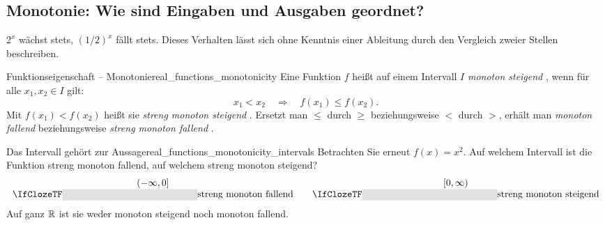 \subsection{Monotonie: Wie sind Eingaben und Ausgaben geordnet?}
\label{subsec:real_functions_monotonicity}
$2^x$ wächst stets, $(1/2)^x$ fällt stets. Dieses Verhalten lässt
sich ohne Kenntnis einer Ableitung durch den Vergleich zweier Stellen
beschreiben.
\par\noindent\begin{minipage}{\linewidth}
\begin{DefinitionBox}{Funktionseigenschaft -- Monotonie}{real_functions_monotonicity}
  Eine Funktion $f$ heißt auf einem Intervall $I$
  \emph{monoton steigend} ,
  wenn für alle $x_1,x_2\in I$ gilt:
  \[
    x_1<x_2\quad\Longrightarrow\quad f(x_1)\le f(x_2).
  \]
  Mit $f(x_1)<f(x_2)$ heißt sie \emph{streng monoton steigend}
  .
  Ersetzt man $\le$ durch $\ge$ beziehungsweise $<$ durch $>$,
  erhält man \emph{monoton fallend} 
  beziehungsweise \emph{streng monoton fallend} .
\end{DefinitionBox}
\begin{ExampleBox}[before skip=0.3\baselineskip]{Das Intervall gehört zur Aussage}{real_functions_monotonicity_intervals}
  Betrachten Sie erneut $f(x)=x^2$. Auf welchem Intervall ist die
  Funktion streng monoton fallend, auf welchem streng monoton steigend?
  \[
    \begin{array}{c@{\qquad}c}
      (-\infty,0]&[0,\infty)\\
      \Cloze{5cm}{\text{streng monoton fallend}}&
      \Cloze{5cm}{\text{streng monoton steigend}}
    \end{array}
  \]
  Auf ganz $\mathbb{R}$ ist sie weder monoton steigend noch monoton fallend.
\end{ExampleBox}
\end{minipage}


